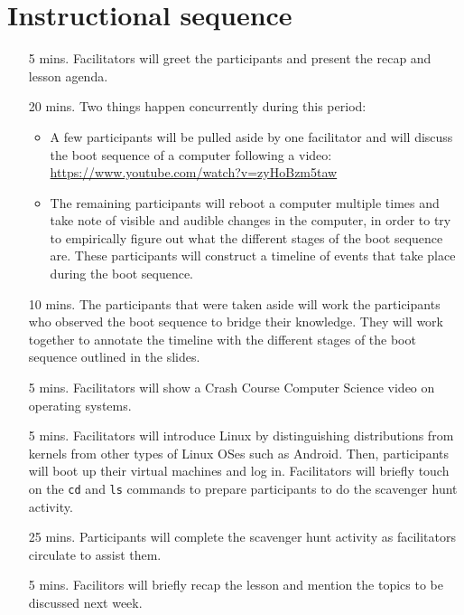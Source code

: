 \documentclass[11pt]{article}
\begin{document}
\section*{Instructional sequence}

\begin{itemize}
\item[5 mins.]
  Facilitators will greet the participants and present the recap and lesson
  agenda.
\item[20 mins.]
  Two things happen concurrently during this period:
  \begin{itemize}
  \item
    A few participants will be pulled aside by one facilitator and will discuss
    the boot sequence of a computer following a video:
    \url{https://www.youtube.com/watch?v=zyHoBzm5taw}
  \item
    The remaining participants will reboot a computer multiple times and take
    note of visible and audible changes in the computer, in order to try to
    empirically figure out what the different stages of the boot sequence are.
    These participants will construct a timeline of events that take place
    during the boot sequence.
  \end{itemize}
\item[10 mins.]
  The participants that were taken aside will work the participants who observed
  the boot sequence to bridge their knowledge. They will work together to
  annotate the timeline with the different stages of the boot sequence outlined
  in the slides.
\item[5 mins.]
  Facilitators will show a Crash Course Computer Science video on operating
  systems.
\item[5 mins.]
  Facilitators will introduce Linux by distinguishing distributions from kernels
  from other types of Linux OSes such as Android.
  Then, participants will boot up their virtual machines and log in.
  Facilitators will briefly touch on the \texttt{cd} and \texttt{ls} commands to
  prepare participants to do the scavenger hunt activity.
\item[25 mins.]
  Participants will complete the scavenger hunt activity as facilitators
  circulate to assist them.
\item[5 mins.]
  Facilitors will briefly recap the lesson and mention the topics to be
  discussed next week.
\end{itemize}
\end{document}
